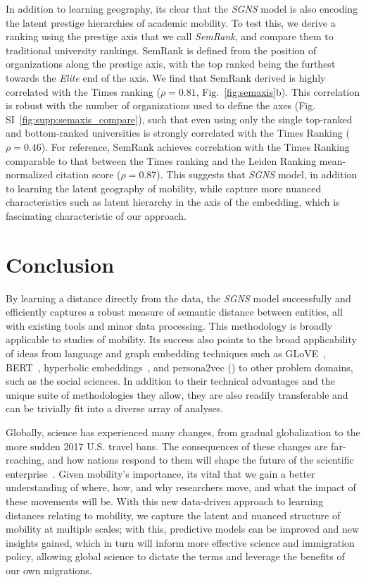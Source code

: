 \documentclass[12pt]{article} %
\def\SGNS{\textit{SGNS}}
\begin{document}
In addition to learning geography, its clear that the \SGNS{} model is also encoding the latent prestige hierarchies of academic mobility. 
To test this, we derive a ranking using the prestige axis that we call \textit{SemRank}, and compare them to traditional university rankings. 
SemRank is defined from the position of organizations along the prestige axis, with the top ranked being the furthest towards the \textit{Elite} end of the axis.
We find that SemRank derived is highly correlated with the Times ranking ($\rho = 0.81$, Fig.~\ref{fig:semaxis}b). 
This correlation is robust with the number of organizations used to define the axes (Fig. SI~\ref{fig:supp:semaxis_compare}), such that even using only the single top-ranked and bottom-ranked universities is strongly correlated with the Times Ranking ($\rho = 0.46$). 
For reference, SemRank achieves correlation with the Times Ranking comparable to that between the Times ranking and the Leiden Ranking mean-normalized citation score ($\rho = 0.87$). 
This suggests that \SGNS{} model, in addition to learning the latent geography of mobility, while capture more nuanced characteristics such as latent hierarchy in the axis of the embedding, which is fascinating characteristic of our approach.


%
% 
\section*{Conclusion}

By learning a distance directly from the data, the \SGNS{} model successfully  and efficiently captures a robust measure of semantic distance between entities, all with existing tools and minor data processing. 
This methodology is broadly applicable to studies of mobility.
Its success also points to the broad applicability of ideas from language and graph embedding techniques such as GLoVE~\autocite{pennington2014glove}, BERT~\autocite{devlin2018bert}, hyperbolic embeddings~\autocite{nickel2017poincare, linzhuo2020hyperbolic}, and persona2vec () to other problem domains, such as the social sciences. 
In addition to their technical advantages and the unique suite of methodologies they allow, they are also  readily transferable and can be trivially fit into a diverse array of analyses. 

Globally, science has experienced many changes, from gradual globalization to the more sudden 2017 U.S. travel bans. 
The consequences of these changes are far-reaching, and how nations respond to them will shape the future of the scientific enterprise~\autocite{chinchilla2018travelban, wagner2017open, sugimoto2017mostimpact, whetsell2019democracy}.
Given mobility's importance, its vital that we gain a better understanding of where, how, and why researchers move, and what the impact of these movements will be. 
With this new data-driven approach to learning distances relating to mobility, we capture the latent and nuanced structure of mobility at multiple scales;
with this, predictive models can be improved and new insights gained, which in turn will inform more effective science and immigration policy, allowing global science to dictate the terms and leverage the benefits of our own migrations. 
\end{document}
